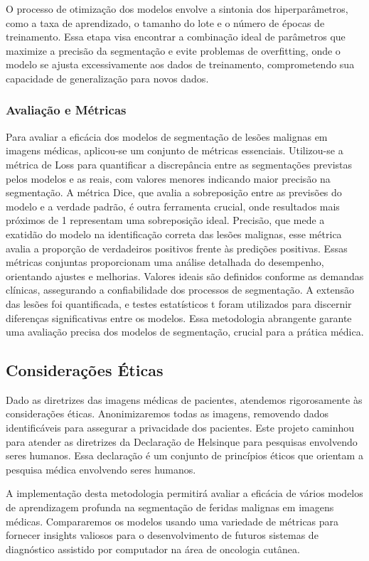         O processo de otimização dos modelos envolve a sintonia dos hiperparâmetros, como a taxa de aprendizado, o tamanho do lote e o número de épocas de treinamento. Essa etapa visa encontrar a combinação ideal de parâmetros que maximize a precisão da segmentação e evite problemas de overfitting, onde o modelo se ajusta excessivamente aos dados de treinamento, comprometendo sua capacidade de generalização para novos dados.
    
    \subsubsection{Avaliação e Métricas}
        Para avaliar a eficácia dos modelos de segmentação de lesões malignas em imagens médicas, aplicou-se um conjunto de métricas essenciais. Utilizou-se a métrica de Loss para quantificar a discrepância entre as segmentações previstas pelos modelos e as reais, com valores menores indicando maior precisão na segmentação. A métrica Dice, que avalia a sobreposição entre as previsões do modelo e a verdade padrão, é outra ferramenta crucial, onde resultados mais próximos de 1 representam uma sobreposição ideal. Precisão, que mede a exatidão do modelo na identificação correta das lesões malignas, esse métrica avalia a proporção de verdadeiros positivos frente às predições positivas. Essas métricas conjuntas proporcionam uma análise detalhada do desempenho, orientando ajustes e melhorias. Valores ideais são definidos conforme as demandas clínicas, assegurando a confiabilidade dos processos de segmentação. A extensão das lesões foi quantificada, e testes estatísticos t foram utilizados para discernir diferenças significativas entre os modelos. Essa metodologia abrangente garante uma avaliação precisa dos modelos de segmentação, crucial para a prática médica.

\subsection{Considerações Éticas}

    Dado as diretrizes das imagens médicas de pacientes, atendemos rigorosamente às considerações éticas. Anonimizaremos todas as imagens, removendo dados identificáveis para assegurar a privacidade dos pacientes. Este projeto caminhou para atender as diretrizes da Declaração de Helsinque para pesquisas envolvendo seres humanos. Essa declaração é um conjunto de princípios éticos que orientam a pesquisa médica envolvendo seres humanos.
    
    A implementação desta metodologia permitirá avaliar a eficácia de vários modelos de aprendizagem profunda na segmentação de feridas malignas em imagens médicas. Compararemos os modelos usando uma variedade de métricas para fornecer insights valiosos para o desenvolvimento de futuros sistemas de diagnóstico assistido por computador na área de oncologia cutânea.

